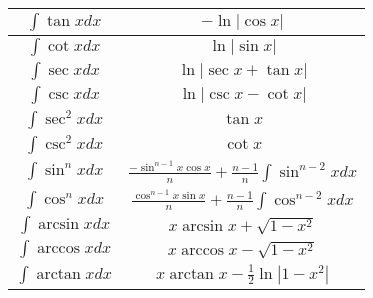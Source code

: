 \documentclass[a4paper]{amsart}
\begin{document}
\begin{multicols}{2}
      \begin{tabular}{|c|c|}
        \hline 
        $\int \tan x dx$ & $-\ln |\cos x|$ \\ \hline
        $\int \cot x dx$ & $\ln |\sin x|$ \\ \hline
        $\int \sec x dx$ & $\ln |\sec x + \tan x|$ \\ \hline
        $\int \csc x dx$ & $\ln |\csc x - \cot x|$ \\ \hline
        $\int \sec^2 x dx$ & $\tan x$ \\ \hline
        $\int \csc^2 x dx$ & $\cot x$ \\ \hline
        $\int \sin^n x dx$ & $\frac{-\sin^{n-1} x \cos x}{n} + \frac{n-1}{n}\int \sin^{n-2}x dx$ \\ \hline
        $\int \cos^n x dx$ & $\frac{\cos^{n-1} x \sin x}{n} + \frac{n-1}{n}\int \cos^{n-2}x dx$ \\ \hline        
        $\int \arcsin x dx$ & $x \arcsin x + \sqrt{1 - x^2}$ \\ \hline
        $\int \arccos x dx$ & $x \arccos x - \sqrt{1 - x^2}$ \\ \hline
        $\int \arctan x dx$ & $x \arctan x - \frac{1}{2} \ln |1 - x^2|$ \\ \hline
      \end{tabular}
  \end{multicols}
\end{document}
